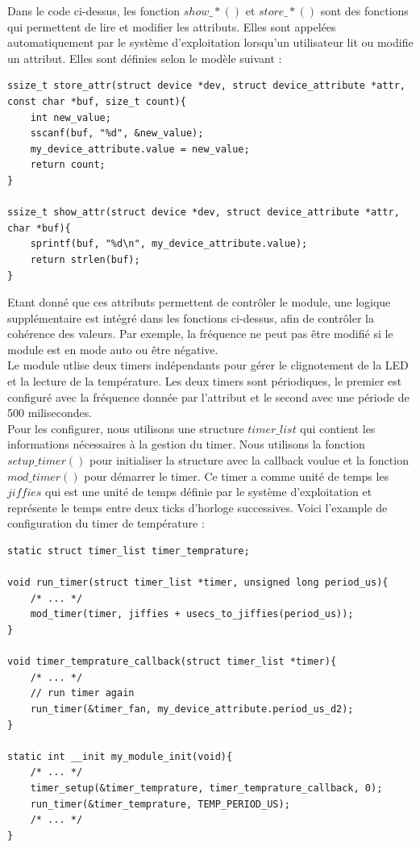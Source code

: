 \documentclass[
	a4paper, %
	10pt, %
]{CSUniSchoolLabReport}
\begin{document}
Dans le code ci-dessus, les fonction $show\_*()$ et $store\_*()$ sont des fonctions qui permettent de lire et modifier les attributs. Elles sont appelées automatiquement par le système d'exploitation lorsqu'un utilisateur lit ou modifie un attribut. Elles sont définies selon le modèle suivant :

\begin{lstlisting}[style=CStyle]
ssize_t store_attr(struct device *dev, struct device_attribute *attr, const char *buf, size_t count){
	int new_value;
	sscanf(buf, "%d", &new_value);
	my_device_attribute.value = new_value;
	return count;
}

ssize_t show_attr(struct device *dev, struct device_attribute *attr, char *buf){
	sprintf(buf, "%d\n", my_device_attribute.value);
	return strlen(buf);
}
\end{lstlisting}

Etant donné que ces attributs permettent de contrôler le module, une logique supplémentaire est intégré dans les fonctions ci-dessus, afin de contrôler la cohérence des valeurs. Par exemple, la fréquence ne peut pas être modifié si le module est en mode auto ou être négative. \\

Le module utlise deux timers indépendants pour gérer le clignotement de la LED et la lecture de la température. Les deux timers sont périodiques, le premier est configuré avec la fréquence donnée par l'attribut et le second avec une période de 500 milisecondes. \\
Pour les configurer, nous utilisons une structure $timer\_list$ qui contient les informations nécessaires à la gestion du timer. Nous utilisons la fonction $setup\_timer()$ pour initialiser la structure avec la callback voulue et la fonction $mod\_timer()$ pour démarrer le timer. Ce timer a comme unité de temps les $jiffies$ qui est une unité de temps définie par le système d'exploitation et représente le temps entre deux ticks d'horloge successives. Voici l'example de configuration du timer de température :
\begin{lstlisting}[style=CStyle]
static struct timer_list timer_temprature;

void run_timer(struct timer_list *timer, unsigned long period_us){
	/* ... */
	mod_timer(timer, jiffies + usecs_to_jiffies(period_us));
}

void timer_temprature_callback(struct timer_list *timer){
	/* ... */
	// run timer again
	run_timer(&timer_fan, my_device_attribute.period_us_d2);		
}

static int __init my_module_init(void){
	/* ... */
    timer_setup(&timer_temprature, timer_temprature_callback, 0);
    run_timer(&timer_temprature, TEMP_PERIOD_US);
	/* ... */
}
\end{lstlisting}
\end{document}
